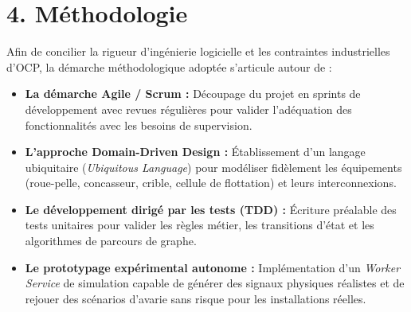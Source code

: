 \section*{4. Méthodologie}
Afin de concilier la rigueur d'ingénierie logicielle et les contraintes industrielles d'OCP, la démarche méthodologique adoptée s'articule autour de :
\begin{itemize}
    \item \textbf{La démarche Agile / Scrum :} Découpage du projet en sprints de développement avec revues régulières pour valider l'adéquation des fonctionnalités avec les besoins de supervision.
    \item \textbf{L'approche Domain-Driven Design :} Établissement d'un langage ubiquitaire (\textit{Ubiquitous Language}) pour modéliser fidèlement les équipements (roue-pelle, concasseur, crible, cellule de flottation) et leurs interconnexions.
    \item \textbf{Le développement dirigé par les tests (TDD) :} Écriture préalable des tests unitaires pour valider les règles métier, les transitions d'état et les algorithmes de parcours de graphe.
    \item \textbf{Le prototypage expérimental autonome :} Implémentation d'un \textit{Worker Service} de simulation capable de générer des signaux physiques réalistes et de rejouer des scénarios d'avarie sans risque pour les installations réelles.
\end{itemize}

